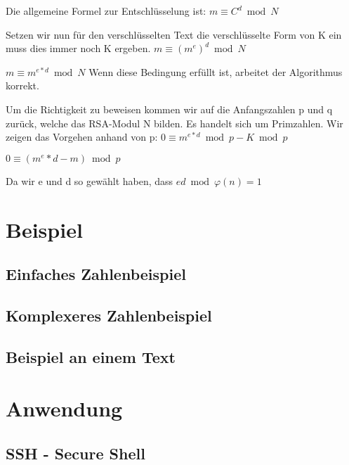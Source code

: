 
Die allgemeine Formel zur Entschlüsselung ist:
$ m \equiv C^d \bmod N $

Setzen wir nun für den verschlüsselten Text die verschlüsselte Form von K ein muss dies immer noch K ergeben.
$ m \equiv (m^e)^d \bmod N $

$ m \equiv m^{e*d} \bmod N $
Wenn diese Bedingung erfüllt ist, arbeitet der Algorithmus korrekt.

Um die Richtigkeit zu beweisen kommen wir auf die Anfangszahlen p und q zurück, welche das RSA-Modul N bilden. Es handelt sich um Primzahlen. Wir zeigen das Vorgehen anhand von p:
$ 0 \equiv m^{e*d} \bmod p - K \bmod p $

$ 0 \equiv (m^e*d-m) \bmod p $

Da wir e und d so gewählt haben, dass 
$ ed \bmod \varphi(n) = 1 $ 


\section{Beispiel}
\subsection{Einfaches Zahlenbeispiel}
\subsection{Komplexeres Zahlenbeispiel}
\subsection{Beispiel an einem Text}
\section{Anwendung}
\subsection{SSH - Secure Shell}
